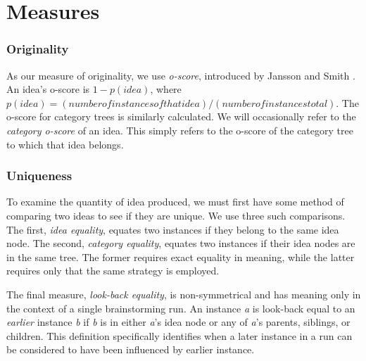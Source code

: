 \section{Measures}

\subsubsection{Originality}

As our measure of originality, we use \emph{o-score}, introduced by Jansson and Smith \cite{jansson_design_1991}. An idea's o-score is $1 - p(idea)$, where $p(idea) = (number of instances of that idea)/(number of instances total)$. The o-score for category trees is similarly calculated. We will occasionally refer to the \emph{category o-score} of an idea. This simply refers to the o-score of the category tree to which that idea belongs.

\subsubsection{Uniqueness}

To examine the quantity of idea produced, we must first have some method of comparing two ideas to see if they are unique. We use three such comparisons. The first, \emph{idea equality}, equates two instances if they belong to the same idea node. The second, \emph{category equality}, equates two instances if their idea nodes are in the same tree. The former requires exact equality in meaning, while the latter requires only that the same strategy is employed.

The final measure, \emph{look-back equality}, is non-symmetrical and has meaning only in the context of a single brainstorming run. An instance \emph{a} is look-back equal to an \emph{earlier} instance \emph{b} if \emph{b} is in either \emph{a}'s idea node or any of \emph{a}'s parents, siblings, or children. This definition specifically identifies when a later instance in a run can be considered to have been influenced by earlier instance.